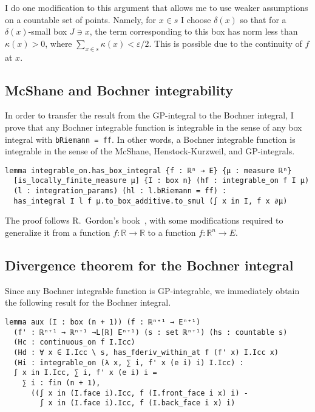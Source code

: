 \documentclass[a4paper, UKenglish,cleveref, autoref, thm-restate]{lipics-v2021}
\newcommand{\bbR}{\mathbb{R}}
\newcommand{\eps}{\varepsilon}
\begin{document}
I do one modification to this argument that allows me to use weaker
assumptions on a countable set of points. Namely, for \(x\in s\) I
choose \(\delta(x)\) so that for a \(\delta(x)\)-small box \(J\ni x\),
the term corresponding to this box has norm less than \(\kappa(x)>0\),
where \(\sum_{x\in s}\kappa(x)<\eps/2\). This is possible due to the
continuity of \(f\) at \(x\).

\subsection{McShane and Bochner integrability}%
\label{sec:mcsh-bochn-integr}

In order to transfer the result from the GP-integral to the Bochner
integral, I prove that any Bochner integrable function is integrable
in the sense of any box integral with \lstinline~bRiemann = ff~. In
other words, a Bochner integrable function is integrable in the sense
of the McShane, Henstock-Kurzweil, and GP-integrals.

\begin{lstlisting}
lemma integrable_on.has_box_integral {f : ℝⁿ → E} {μ : measure ℝⁿ}
  [is_locally_finite_measure μ] {I : box n} (hf : integrable_on f I μ)
  (l : integration_params) (hl : l.bRiemann = ff) :
  has_integral I l f μ.to_box_additive.to_smul (∫ x in I, f x ∂μ)
\end{lstlisting}

The proof follows R.~Gordon's book~\cite{Gordon55}, with some
modifications required to generalize it from a function
\(f\colon\bbR\to\bbR\) to a function \(f\colon\bbR^{n}\to E\).


\subsection{Divergence theorem for the Bochner integral}%
\label{sec:diverg-theor-bochn}

Since any Bochner integrable function is GP-integrable, we immediately
obtain the following result for the Bochner integral.

\begin{lstlisting}
lemma aux (I : box (n + 1)) (f : ℝⁿ⁺¹ → Eⁿ⁺¹)
  (f' : ℝⁿ⁺¹ → ℝⁿ⁺¹ →L[ℝ] Eⁿ⁺¹) (s : set ℝⁿ⁺¹) (hs : countable s)
  (Hc : continuous_on f I.Icc)
  (Hd : ∀ x ∈ I.Icc \ s, has_fderiv_within_at f (f' x) I.Icc x)
  (Hi : integrable_on (λ x, ∑ i, f' x (e i) i) I.Icc) :
  ∫ x in I.Icc, ∑ i, f' x (e i) i =
    ∑ i : fin (n + 1),
      ((∫ x in (I.face i).Icc, f (I.front_face i x) i) -
        ∫ x in (I.face i).Icc, f (I.back_face i x) i)
\end{lstlisting}
\end{document}
